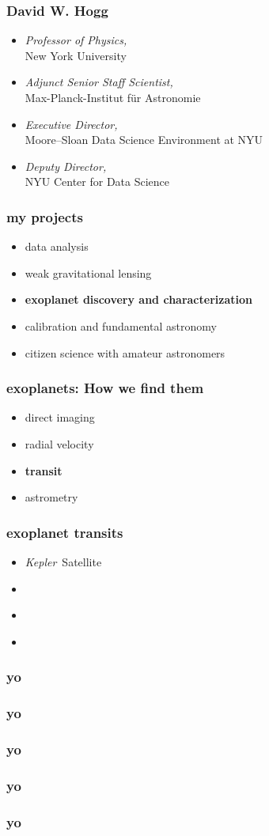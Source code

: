 \documentclass{beamer}
\renewcommand{\emph}[1]{\textbf{#1}}
\newcommand{\project}[1]{\textsl{#1}}
\newcommand{\Kepler}{\project{Kepler}}
\begin{document}
\begin{frame}
  \frametitle{David W. Hogg}
  \begin{itemize}
  \item \textsl{Professor of Physics,}\\ New York University
  \item \textsl{Adjunct Senior Staff Scientist,}\\ Max-Planck-Institut f\"ur Astronomie
  \item \textsl{Executive Director,}\\ Moore--Sloan Data Science Environment at NYU
  \item \textsl{Deputy Director,}\\ NYU Center for Data Science
  \end{itemize}
\end{frame}

\begin{frame}
  \frametitle{my projects}
  \begin{itemize}
  \item data analysis
  \item weak gravitational lensing
  \item \emph{exoplanet discovery and characterization}
  \item calibration and fundamental astronomy
  \item citizen science with amateur astronomers
  \end{itemize}
\end{frame}

\begin{frame}
  \frametitle{exoplanets: How we find them}
  \begin{itemize}
  \item direct imaging
  \item radial velocity
  \item \emph{transit}
  \item astrometry
  \end{itemize}
\end{frame}

\begin{frame}
  \frametitle{exoplanet transits}
  \begin{itemize}
  \item \Kepler\ Satellite
  \item ~
  \item ~
  \item ~
  \end{itemize}
\end{frame}

\begin{frame}
  \frametitle{yo}
\end{frame}

\begin{frame}
  \frametitle{yo}
\end{frame}

\begin{frame}
  \frametitle{yo}
\end{frame}

\begin{frame}
  \frametitle{yo}
\end{frame}

\begin{frame}
  \frametitle{yo}
\end{frame}
\end{document}

